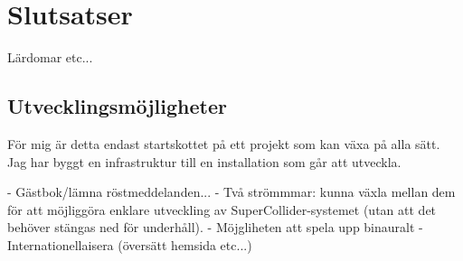 \documentclass[11pt, a4paper]{article} %
\begin{document}
\section*{Slutsatser}
Lärdomar etc...

\subsection*{Utvecklingsmöjligheter}
För mig är detta endast startskottet på ett projekt som kan växa på alla sätt. Jag har byggt en infrastruktur till en installation som går att utveckla.

- Gästbok/lämna röstmeddelanden...
- Två strömmmar: kunna växla mellan dem för att möjliggöra enklare utveckling av SuperCollider-systemet (utan att det behöver stängas ned för underhåll).
- Möjgliheten att spela upp binauralt
- Internationellaisera (översätt hemsida etc...)



{}
\printbibheading
\printbibliography[type=book,title={Böcker},heading=subbibliography]
\printbibliography[type=article,title={Artiklar},heading=subbibliography]
\printbibliography[type=online,title={Hemsidor},heading=subbibliography]

\clearpage
\begin{appendices}
\printglossary[nonumberlist]
\end{appendices}
\end{document}
